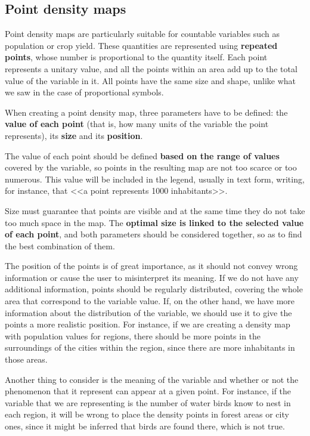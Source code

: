 \subsection{Point density maps}

Point density maps are particularly suitable for countable variables such as population or crop yield. These quantities are represented using \textbf{repeated points}, whose number is proportional to the quantity itself. Each point represents a unitary value, and all the points within an area add up to the total value of the variable in it. All points have the same size and shape, unlike what we saw in the case of proportional symbols.

When creating a point density map, three parameters have to be defined: the \textbf{value of each point} (that is, how many units of the variable the point represents), its \textbf{size} and its \textbf{position}.

The value of each point should be defined \textbf{based on the range of values} covered by the variable, so points in the resulting map are not too scarce or too numerous. This value will be included in the legend, usually in text form, writing, for instance, that <<a point represents 1000 inhabitants>>.

Size must guarantee that points are visible and at the same time they do not take too much space in the map. The \textbf{optimal size is linked to the selected value of each point}, and both parameters should be considered together, so as to find the best combination of them. 

The position of the points is of great importance, as it should not convey wrong information or cause the user to misinterpret its meaning. If we do not have any additional information, points should be regularly distributed, covering the whole area that correspond to the variable value. If, on the other hand, we have more information about the distribution of the variable, we should use it to give the points a more realistic position. For instance, if we are creating a density map with population values for regions, there should be more points in the surroundings of the cities within the region, since there are more inhabitants in those areas.

Another thing to consider is the meaning of the variable and whether or not the phenomenon that it represent can appear at a given point. For instance, if the variable that we are representing is the number of water birds know to nest in each region, it will be wrong to place the density points in forest areas or city ones, since it might be inferred that birds are found there, which is not true.


